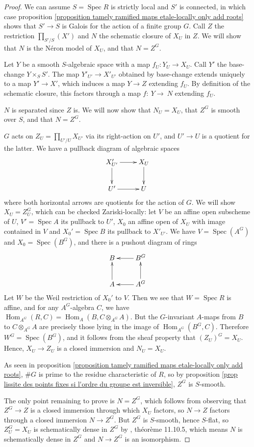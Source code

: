 \documentclass{article}
\DeclareMathOperator{\spec}{Spec}
\DeclareMathOperator{\Hom}{Hom}
\theoremstyle{definition}
\theoremstyle{remark}
\begin{document}
\begin{proof}
We can assume $S=\spec R$ is strictly local and $S'$ is connected, in which case proposition \ref{proposition tamely ramified maps etale-locally only add roots} shows that $S'\longrightarrow S$ is Galois for the action of a finite group $G$. Call $Z$ the restriction $\prod\limits_{S'/S}(X')$ and $N$ the schematic closure of $X_U$ in $Z$. We will show that $N$ is the N\'eron model of $X_U$, and that $N=Z^G$.

Let $Y$ be a smooth $S$-algebraic space with a map $f_U\colon Y_U\longrightarrow X_U$. Call $Y'$ the base-change $Y\times_S S'$. The map $Y'_{U'}\longrightarrow X'_{U'}$ obtained by base-change extends uniquely to a map $Y'\longrightarrow X'$, which induces a map $Y\longrightarrow Z$ extending $f_U$. By definition of the schematic closure, this factors through a map $f\colon~Y\longrightarrow~N$ extending $f_U$.

$N$ is separated since $Z$ is. We will now show that $N_U=X_U$, that $Z^G$ is smooth over $S$, and that $N=Z^G$.

$G$ acts on $Z_U=\prod\limits_{U'/U}X_{U'}$ via its right-action on $U'$, and $U'\longrightarrow U$ is a quotient for the latter. We have a pullback diagram of algebraic spaces
\[
\xymatrix{
X'_{U'}\ar[r]\ar[d]&X_U\ar[d]\\
U'\ar[r]&U
}
\]
where both horizontal arrows are quotients for the action of $G$. We will show $X_U=Z_U^G$, which can be checked Zariski-locally: let $V$ be an affine open subscheme of $U$, $V'=\spec A$ its pullback to $U'$, $X_0$ an affine open of $X_U$ with image contained in $V$ and $X_0'=\spec B$ its pullback to $X'_{U'}$. We have $V=\spec(A^G)$ and $X_0=\spec(B^G)$, and there is a pushout diagram of rings
\[
\xymatrix{
B&B^G\ar[l]\\
A\ar[u]&A^G\ar[u]\ar[l]
}
\]
Let $W$ be the Weil restriction of $X_0'$ to $V$. Then we see that $W=\spec R$ is affine, and for any $A^G$-algebra $C$, we have $\Hom_{A^G}(R,C)=\Hom_A(B,C\otimes_{A^G}A)$. But the $G$-invariant $A$-maps from $B$ to $C\otimes_{A^G}A$ are precisely those lying in the image of $\Hom_{A^G}(B^G,C)$. Therefore $W^G=\spec(B^G)$, and it follows from the sheaf property that $(Z_U)^G=X_U$. Hence, $X_U\longrightarrow Z_U$ is a closed immersion and $N_U=X_U$.

As seen in proposition \ref{proposition tamely ramified maps etale-locally only add roots}, $\#G$ is prime to the residue characteristic of $R$, so by proposition \ref{prop lissite des points fixes si l'ordre du groupe est inversible}, $Z^G$ is $S$-smooth.

The only point remaining to prove is $N=Z^G$, which follows from observing that $Z^G\longrightarrow Z$ is a closed immersion through which $X_U$ factors, so $N\longrightarrow Z$ factors through a closed immersion $N\longrightarrow Z^G$. But $Z^G$ is $S$-smooth, hence $S$-flat, so $Z_U^G=X_U$ is schematically dense in $Z^G$ by \cite{EGA4.3}, théorème 11.10.5, which means $N$ is schematically dense in $Z^G$ and $N\longrightarrow Z^G$ is an isomorphism.
\end{proof}
\end{document}
